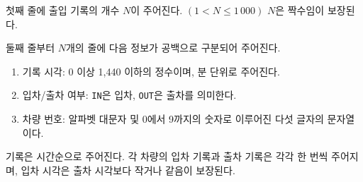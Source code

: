 첫째 줄에 출입 기록의 개수 $N$이 주어진다. $(1 < N \le 1\,000)$
$N$은 짝수임이 보장된다.

둘째 줄부터 $N$개의 줄에 다음 정보가 공백으로 구분되어 주어진다.

\begin{enumerate}
    \item 기록 시각: 0 이상 1,440 이하의 정수이며, 분 단위로 주어진다.
    \item 입차/출차 여부: \texttt{IN}은 입차, \texttt{OUT}은 출차를 의미한다.
    \item 차량 번호: 알파벳 대문자 및 0에서 9까지의 숫자로 이루어진 다섯 글자의 문자열이다.
\end{enumerate}

기록은 시간순으로 주어진다.
각 차량의 입차 기록과 출차 기록은 각각 한 번씩 주어지며, 입차 시각은 출차 시각보다 작거나 같음이 보장된다.
